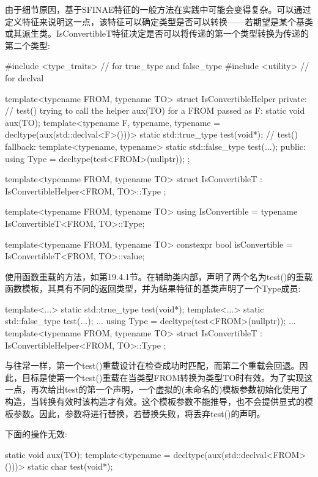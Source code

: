 由于细节原因，基于SFINAE特征的一般方法在实践中可能会变得复杂。可以通过定义特征来说明这一点，该特征可以确定类型是否可以转换——若期望是某个基类或其派生类。IsConvertibleT特征决定是否可以将传递的第一个类型转换为传递的第二个类型:

\begin{cpp}
#include <type_traits> // for true_type and false_type
#include <utility> // for declval

template<typename FROM, typename TO>
struct IsConvertibleHelper {
	private:
	// test() trying to call the helper aux(TO) for a FROM passed as F:
		static void aux(TO);
	template<typename F, typename,
	typename = decltype(aux(std::declval<F>()))>
		static std::true_type test(void*);
	// test() fallback:
	template<typename, typename>
		static std::false_type test(...);
	public:
	using Type = decltype(test<FROM>(nullptr));
};

template<typename FROM, typename TO>
struct IsConvertibleT : IsConvertibleHelper<FROM, TO>::Type {
};

template<typename FROM, typename TO>
using IsConvertible = typename IsConvertibleT<FROM, TO>::Type;

template<typename FROM, typename TO>
constexpr bool isConvertible = IsConvertibleT<FROM, TO>::value;
\end{cpp}

使用函数重载的方法，如第19.4.1节。在辅助类内部，声明了两个名为test()的重载函数模板，其具有不同的返回类型，并为结果特征的基类声明了一个Type成员:

\begin{cpp}
template<...> static std::true_type test(void*);
template<...> static std::false_type test(...);
...
using Type = decltype(test<FROM>(nullptr));
...
template<typename FROM, typename TO>
struct IsConvertibleT : IsConvertibleHelper<FROM, TO>::Type {
};
\end{cpp}

与往常一样，第一个test()重载设计在检查成功时匹配，而第二个重载会回退。因此，目标是使第一个test()重载在当类型FROM转换为类型TO时有效。为了实现这一点，再次给出test的第一个声明，一个虚拟的(未命名的)模板参数初始化使用了构造，当转换有效时该构造才有效。这个模板参数不能推导，也不会提供显式的模板参数。因此，参数将进行替换，若替换失败，将丢弃test()的声明。

下面的操作无效:

\begin{cpp}
static void aux(TO);
template<typename = decltype(aux(std::declval<FROM>()))>
	static char test(void*);
\end{cpp}

